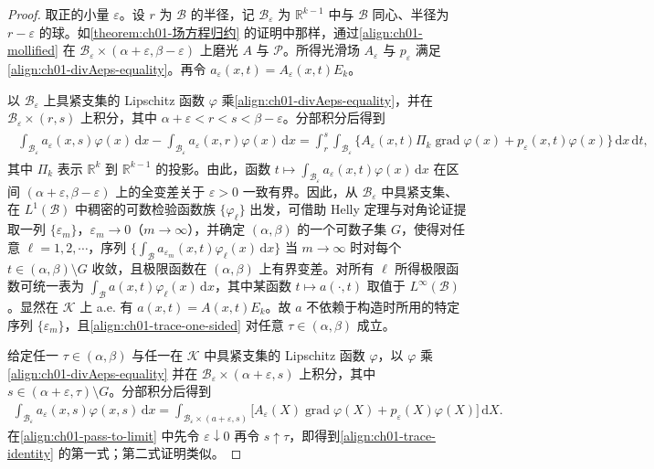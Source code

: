 \documentclass[../../main.tex]{subfiles}
\begin{document}
\begin{proof}
取正的小量 $\varepsilon$。设 $r$ 为 $\mathscr{B}$ 的半径，记 $\mathscr{B}_{\varepsilon}$ 为 $\mathbb{R}^{k-1}$ 中与 $\mathscr{B}$ 同心、半径为 $r-\varepsilon$ 的球。如\cref{theorem:ch01-场方程归约} 的证明中那样，通过\cref{align:ch01-mollified} 在 $\mathscr{B}_{\varepsilon}\times(\alpha+\varepsilon,\beta-\varepsilon)$ 上磨光 $A$ 与 $\mathscr{P}$。所得光滑场 $A_{\varepsilon}$ 与 $p_{\varepsilon}$ 满足\cref{align:ch01-divAeps-equality}。再令 $a_{\varepsilon}(x,t)=A_{\varepsilon}(x,t)E_{k}$。

以 $\mathscr{B}_{\varepsilon}$ 上具紧支集的 Lipschitz 函数 $\varphi$ 乘\cref{align:ch01-divAeps-equality}，并在 $\mathscr{B}_{\varepsilon}\times(r,s)$ 上积分，其中 $\alpha+\varepsilon<r<s<\beta-\varepsilon$。分部积分后得到
\begin{align}
\begin{aligned}
\int_{\mathscr{B}_{\varepsilon}}a_{\varepsilon}(x,s)\varphi(x)\,\mathrm{d}x-\int_{\mathscr{B}_{\varepsilon}}a_{\varepsilon}(x,r)\varphi(x)\,\mathrm{d}x
=\int_{r}^{s}\int_{\mathscr{B}_{\varepsilon}}\bigl\{A_{\varepsilon}(x,t)\Pi_{k}\operatorname{grad}\varphi(x)+p_{\varepsilon}(x,t)\varphi(x)\bigr\}\,\mathrm{d}x\,\mathrm{d}t,
\end{aligned}\label{align:ch01-mollified-integrated}
\end{align}
其中 $\Pi_{k}$ 表示 $\mathbb{R}^{k}$ 到 $\mathbb{R}^{k-1}$ 的投影。由此，函数 $t\mapsto\int_{\mathscr{B}_{\varepsilon}}a_{\varepsilon}(x,t)\varphi(x)\,\mathrm{d}x$ 在区间 $(\alpha+\varepsilon,\beta-\varepsilon)$ 上的全变差关于 $\varepsilon>0$ 一致有界。因此，从 $\mathscr{B}_{\varepsilon}$ 中具紧支集、在 $L^{1}(\mathscr{B})$ 中稠密的可数检验函数族 $\{\varphi_{\ell}\}$ 出发，可借助 Helly 定理与对角论证提取一列 $\{\varepsilon_{m}\}$，$\varepsilon_{m}\to 0$（$m\to\infty$），并确定 $(\alpha,\beta)$ 的一个可数子集 $G$，使得对任意 $\ell=1,2,\cdots$，序列 $\{\int_{\mathscr{B}}a_{\varepsilon_{m}}(x,t)\varphi_{\ell}(x)\,\mathrm{d}x\}$ 当 $m\to\infty$ 时对每个 $t\in(\alpha,\beta)\setminus G$ 收敛，且极限函数在 $(\alpha,\beta)$ 上有界变差。对所有 $\ell$ 所得极限函数可统一表为 $\int_{\mathscr{B}}a(x,t)\varphi_{\ell}(x)\,\mathrm{d}x$，其中某函数 $t\mapsto a(\cdot,t)$ 取值于 $L^{\infty}(\mathscr{B})$。显然在 $\mathscr{K}$ 上 a.e. 有 $a(x,t)=A(x,t)E_{k}$。故 $a$ 不依赖于构造时所用的特定序列 $\{\varepsilon_{m}\}$，且\cref{align:ch01-trace-one-sided} 对任意 $\tau\in(\alpha,\beta)$ 成立。

给定任一 $\tau\in(\alpha,\beta)$ 与任一在 $\mathscr{K}$ 中具紧支集的 Lipschitz 函数 $\varphi$，以 $\varphi$ 乘\cref{align:ch01-divAeps-equality} 并在 $\mathscr{B}_{\varepsilon}\times(\alpha+\varepsilon,s)$ 上积分，其中 $s\in(\alpha+\varepsilon,\tau)\setminus G$。分部积分后得到
\begin{align}
\int_{\mathscr{B}_{\varepsilon}}a_{\varepsilon}(x,s)\varphi(x,s)\,\mathrm{d}x=\int_{\mathscr{B}_{\varepsilon}\times(a+\varepsilon,s)}\bigl[A_{\varepsilon}(X)\operatorname{grad}\varphi(X)+p_{\varepsilon}(X)\varphi(X)\bigr]\,\mathrm{d}X.\label{align:ch01-pass-to-limit}
\end{align}
在\cref{align:ch01-pass-to-limit} 中先令 $\varepsilon\downarrow 0$ 再令 $s\uparrow\tau$，即得到\cref{align:ch01-trace-identity} 的第一式；第二式证明类似。


\end{proof}
\end{document}
